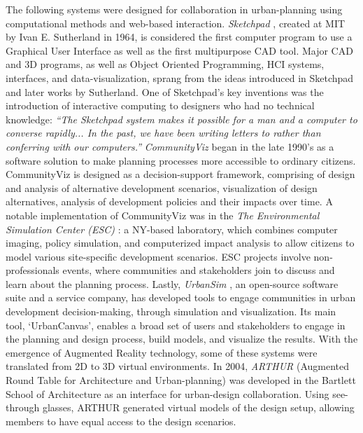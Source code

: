 {{        The following systems were designed for collaboration in urban-planning using computational methods and web-based interaction. \textit{Sketchpad} \cite{Sutherland1963}, created at MIT by Ivan E. Sutherland in 1964, is considered the first computer program to use a Graphical User Interface as well as the first multipurpose CAD tool. Major CAD and 3D programs, as well as Object Oriented Programming, HCI systems, interfaces, and data-visualization, sprang from the ideas introduced in Sketchpad and later works by Sutherland. One of Sketchpad's key inventions was the introduction of interactive computing to designers who had no technical knowledge: \textit{``The Sketchpad system makes it possible for a man and a computer to converse rapidly... In the past, we have been writing letters to rather than conferring with our computers.''} \cite{Sutherland1963}
        \newline
        \textit{CommunityViz} \cite{walker2017planners} began in the late 1990's as a software solution to make planning processes more accessible to ordinary citizens. CommunityViz is designed as a decision-support framework, comprising of design and analysis of alternative development scenarios, visualization of design alternatives, analysis of development policies and their impacts over time. A notable implementation of CommunityViz was in the \textit{The Environmental Simulation Center (ESC)} \cite{shakeri2017use}: a NY-based laboratory, which combines computer imaging, policy simulation, and computerized impact analysis to allow citizens to model various site-specific development scenarios. ESC projects involve non-professionals events, where communities and stakeholders join to discuss and learn about the planning process. Lastly, \textit{UrbanSim} \cite{waddell2008urbansim}, an open-source software suite and a service company, has developed tools to engage communities in urban development decision-making, through simulation and visualization. Its main tool, `UrbanCanvas', enables a broad set of users and stakeholders to engage in the planning and design process, build models, and visualize the results.
        \newline
        With the emergence of Augmented Reality technology, some of these systems were translated from 2D to 3D virtual environments. In 2004, \textit{ARTHUR} (Augmented Round Table for Architecture and Urban-planning) \cite{broll2004arthur} was developed in the Bartlett School of Architecture as an interface for urban-design collaboration. Using see-through glasses, ARTHUR generated virtual models of the design setup, allowing members to have equal access to the design scenarios.
}}
